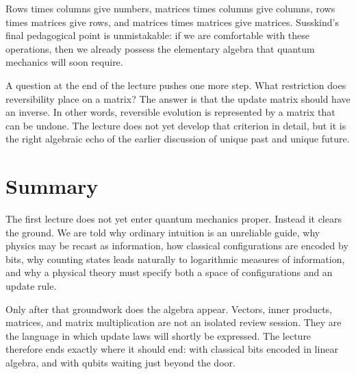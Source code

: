 Rows times columns give numbers, matrices times columns give columns, rows times matrices give rows, and matrices times matrices give matrices. Susskind's final pedagogical point is unmistakable: if we are comfortable with these operations, then we already possess the elementary algebra that quantum mechanics will soon require.

A question at the end of the lecture pushes one more step. What restriction does reversibility place on a matrix? The answer is that the update matrix should have an inverse. In other words, reversible evolution is represented by a matrix that can be undone. The lecture does not yet develop that criterion in detail, but it is the right algebraic echo of the earlier discussion of unique past and unique future.

\section{Summary}

The first lecture does not yet enter quantum mechanics proper. Instead it clears the ground. We are told why ordinary intuition is an unreliable guide, why physics may be recast as information, how classical configurations are encoded by bits, why counting states leads naturally to logarithmic measures of information, and why a physical theory must specify both a space of configurations and an update rule.

Only after that groundwork does the algebra appear. Vectors, inner products, matrices, and matrix multiplication are not an isolated review session. They are the language in which update laws will shortly be expressed. The lecture therefore ends exactly where it should end: with classical bits encoded in linear algebra, and with qubits waiting just beyond the door.